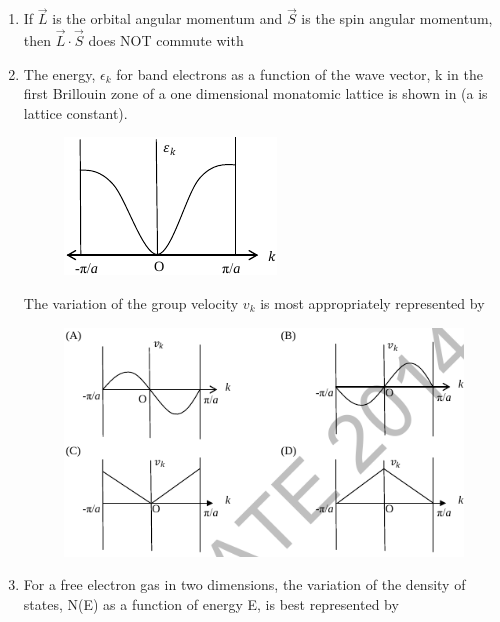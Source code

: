\documentclass[journal,12pt,onecolumn]{IEEEtran}
\theoremstyle{remark}
\begin{document}
\begin{enumerate}
\item If $\vec{L}$ is the orbital angular momentum and $\vec{S}$ is the spin angular momentum, then $\vec{L} \cdot \vec{S}$ does NOT commute with
\hfill{} \begin{enumerate}  \end{enumerate}

\item The energy, $\epsilon_k$ for band electrons as a function of the wave vector, k in the first Brillouin zone  of a one dimensional monatomic lattice is shown in  (a is lattice constant).
\begin{figure}[H]
\centering
 \caption{} \label{32} \includegraphics[width=0.3\columnwidth]{figs/q32.png}
\end{figure}
The variation of the group velocity $v_k$ is most appropriately represented by
\hfill{}
\begin{figure}[H]
\centering
 \caption*{} \label{32o} \includegraphics[width=0.8\columnwidth]{figs/q32o.png}
\end{figure}
\item For a free electron gas in two dimensions, the variation of the density of states, N(E) as a function of energy E, is best represented by

\end{enumerate}
\end{document}
